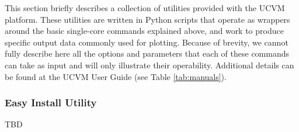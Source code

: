 

This section briefly describes a collection of utilities provided with the UCVM platform. These utilities are written in Python scripts that operate as wrappers around the basic single-core commands explained above, and work to produce specific output data commonly used for plotting. Because of brevity, we cannot fully describe here all the options and parameters that each of these commands can take as input and will only illustrate their operability. Additional details can be found at the UCVM User Guide (see Table \ref{tab:manuals}).

\subsubsection{Easy Install Utility}

TBD
